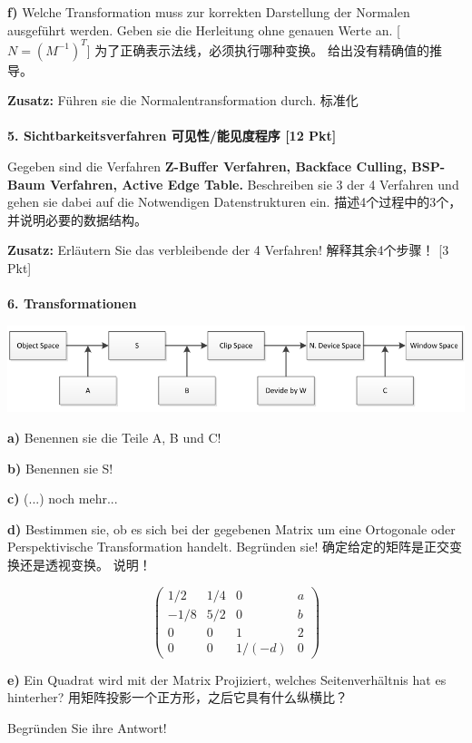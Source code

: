 \documentclass[fleqn]{article}
\begin{document}
\indent\textbf{f)} Welche Transformation muss zur korrekten Darstellung der Normalen ausgeführt werden. Geben sie die Herleitung ohne genauen Werte an. [$N=(M^{-1})^T$]
为了正确表示法线，必须执行哪种变换。 给出没有精确值的推导。

\textbf{Zusatz:} Führen sie die Normalentransformation durch. 标准化
\\
\\
\noindent\textbf{5. Sichtbarkeitsverfahren 可见性/能见度程序 [12 Pkt]}

Gegeben sind die Verfahren \textbf{Z-Buffer Verfahren, Backface Culling, BSP-Baum Verfahren, Active Edge Table.} Beschreiben sie 3 der 4 Verfahren und gehen sie dabei auf die Notwendigen Datenstrukturen ein. 
描述4个过程中的3个，并说明必要的数据结构。

\textbf{Zusatz:} Erläutern Sie das verbleibende der 4 Verfahren! 解释其余4个步骤！ [3 Pkt]
\\
\\
\noindent\textbf{6. Transformationen}

\begin{center}
    \includegraphics[scale=0.5]{7.png}
\end{center}

\indent\textbf{a)} Benennen sie die Teile A, B und C!

\indent\textbf{b)} Benennen sie S!

\indent\textbf{c)} (...) noch mehr...

\indent\textbf{d)} Bestimmen sie, ob es sich bei der gegebenen Matrix um eine Ortogonale oder Perspektivische Transformation handelt. Begründen sie!
确定给定的矩阵是正交变换还是透视变换。 说明！

$$\begin{pmatrix}
    1/2&1/4&0&a\\
    -1/8&5/2&0&b\\
    0&0&1&2\\
    0&0&1/(-d)&0
\end{pmatrix}$$

\indent\textbf{e)} Ein Quadrat wird mit der Matrix Projiziert, welches Seitenverhältnis hat es hinterher? 
用矩阵投影一个正方形，之后它具有什么纵横比？

\indent\indent Begründen Sie ihre Antwort!
\end{document}
